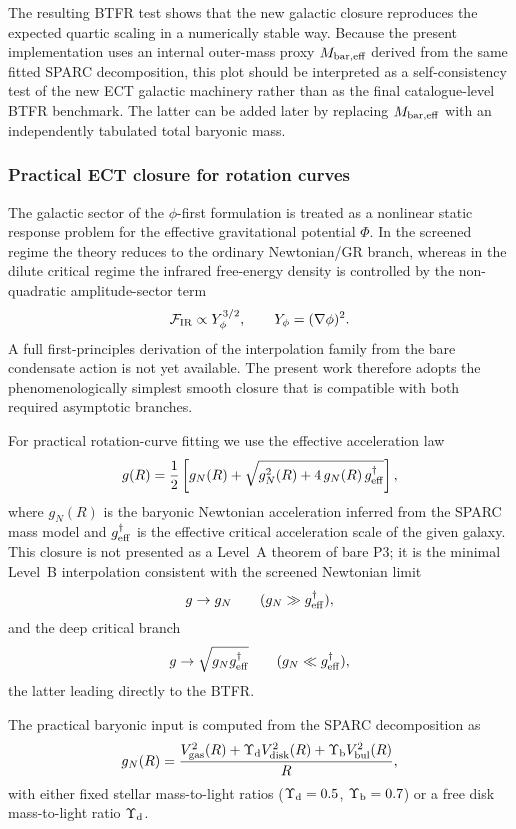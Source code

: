 \documentclass[11pt,a4paper]{article}
\numberwithin{equation}{section}
\begin{document}
The resulting BTFR test shows that the new galactic closure reproduces
the expected quartic scaling in a numerically stable way.  Because the
present implementation uses an internal outer-mass proxy
$M_{\rm bar,eff}$ derived from the same fitted SPARC decomposition, this
plot should be interpreted as a self-consistency test of the new ECT
galactic machinery rather than as the final catalogue-level BTFR
benchmark.  The latter can be added later by replacing
$M_{\rm bar,eff}$ with an independently tabulated total baryonic mass.

\subsubsection*{Practical ECT closure for rotation curves}

The galactic sector of the $\phi$-first formulation is treated as a
nonlinear static response problem for the effective gravitational
potential $\Phi$. In the screened regime the theory reduces to the
ordinary Newtonian/GR branch, whereas in the dilute critical regime the
infrared free-energy density is controlled by the non-quadratic
amplitude-sector term
\[
\mathcal{F}_{\rm IR}\propto Y_\phi^{3/2},
\qquad
Y_\phi=(\nabla\phi)^2.
\]
A full first-principles derivation of the interpolation family from the
bare condensate action is not yet available. The present work therefore
adopts the phenomenologically simplest smooth closure that is
compatible with both required asymptotic branches.

For practical rotation-curve fitting we use the effective acceleration law
\begin{equation}
g(R)=\frac{1}{2}\left[g_N(R)+\sqrt{g_N^2(R)+4\,g_N(R)\,g^\dagger_{\rm eff}}\right],
\label{eq:ect_rotation_closure_main}
\end{equation}
where $g_N(R)$ is the baryonic Newtonian acceleration inferred from the
SPARC mass model and $g^\dagger_{\rm eff}$ is the effective critical
acceleration scale of the given galaxy. This closure is not presented
as a Level~A theorem of bare P3; it is the minimal Level~B
interpolation consistent with the screened Newtonian limit
\[
g\to g_N \qquad (g_N\gg g^\dagger_{\rm eff}),
\]
and the deep critical branch
\[
g\to \sqrt{g_N g^\dagger_{\rm eff}}
\qquad (g_N\ll g^\dagger_{\rm eff}),
\]
the latter leading directly to the BTFR.

The practical baryonic input is computed from the SPARC decomposition as
\begin{equation}
g_N(R)=
\frac{
V_{\rm gas}^2(R)+\Upsilon_{\rm d}V_{\rm disk}^2(R)+
\Upsilon_{\rm b}V_{\rm bul}^2(R)
}{R},
\label{eq:gn_sparc_main}
\end{equation}
with either fixed stellar mass-to-light ratios
($\Upsilon_{\rm d}=0.5$, $\Upsilon_{\rm b}=0.7$) or a free disk
mass-to-light ratio $\Upsilon_{\rm d}$.
\end{document}
